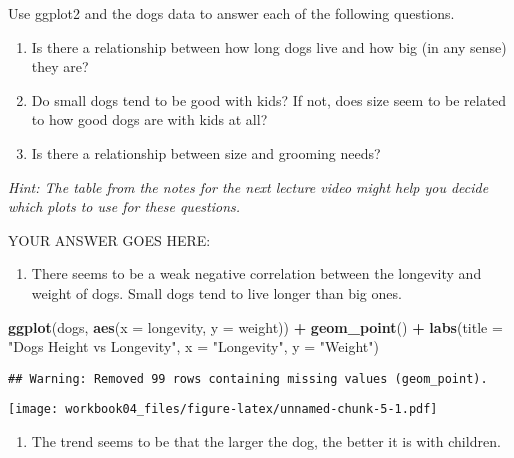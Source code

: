 \documentclass[
]{article}
\newenvironment{Shaded}{\begin{snugshade}}{\end{snugshade}}
\newcommand{\DataTypeTok}[1]{\textcolor[rgb]{0.13,0.29,0.53}{#1}}
\newcommand{\KeywordTok}[1]{\textcolor[rgb]{0.13,0.29,0.53}{\textbf{#1}}}
\newcommand{\NormalTok}[1]{#1}
\newcommand{\OperatorTok}[1]{\textcolor[rgb]{0.81,0.36,0.00}{\textbf{#1}}}
\newcommand{\StringTok}[1]{\textcolor[rgb]{0.31,0.60,0.02}{#1}}
\providecommand{\tightlist}{%
  \setlength{\itemsep}{0pt}\setlength{\parskip}{0pt}}
\begin{document}
Use ggplot2 and the dogs data to answer each of the following questions.

\begin{enumerate}
\def\labelenumi{\arabic{enumi}.}
\item
  Is there a relationship between how long dogs live and how big (in any
  sense) they are?
\item
  Do small dogs tend to be good with kids? If not, does size seem to be
  related to how good dogs are with kids at all?
\item
  Is there a relationship between size and grooming needs?
\end{enumerate}

\emph{Hint: The table from the notes for the next lecture video might
help you decide which plots to use for these questions.}

YOUR ANSWER GOES HERE:

\begin{enumerate}
\def\labelenumi{\arabic{enumi}.}
\tightlist
\item
  There seems to be a weak negative correlation between the longevity
  and weight of dogs. Small dogs tend to live longer than big ones.
\end{enumerate}

\begin{Shaded}
\begin{Highlighting}[]
\KeywordTok{ggplot}\NormalTok{(dogs, }\KeywordTok{aes}\NormalTok{(}\DataTypeTok{x =}\NormalTok{ longevity, }\DataTypeTok{y =}\NormalTok{ weight)) }\OperatorTok{+}
\StringTok{   }\KeywordTok{geom\_point}\NormalTok{() }\OperatorTok{+}
\StringTok{   }\KeywordTok{labs}\NormalTok{(}\DataTypeTok{title =} \StringTok{"Dogs Height vs Longevity"}\NormalTok{, }\DataTypeTok{x =} \StringTok{"Longevity"}\NormalTok{, }\DataTypeTok{y =} \StringTok{"Weight"}\NormalTok{)}
\end{Highlighting}
\end{Shaded}

\begin{verbatim}
## Warning: Removed 99 rows containing missing values (geom_point).
\end{verbatim}

\texttt{[image: workbook04\_files/figure-latex/unnamed-chunk-5-1.pdf]}

\begin{enumerate}
\def\labelenumi{\arabic{enumi}.}
\setcounter{enumi}{1}
\tightlist
\item
  The trend seems to be that the larger the dog, the better it is with
  children.
\end{enumerate}
\end{document}
